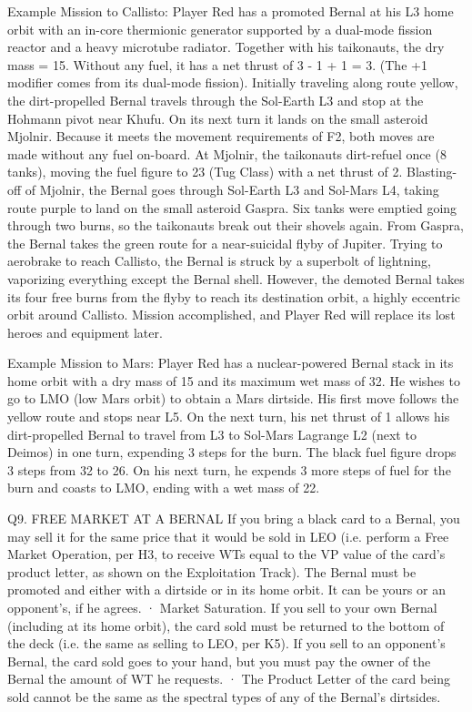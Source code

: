\documentclass[a4paper]{book}
\begin{document}
Example Mission to Callisto: Player Red has a promoted Bernal at his L3 home orbit with an in-core thermionic generator supported by a dual-mode fission reactor and a heavy microtube radiator. Together with his taikonauts, the dry mass = 15. Without any fuel, it has a net thrust of 3 - 1 + 1 = 3. (The +1 modifier comes from its dual-mode fission). Initially traveling along route yellow, the dirt-propelled Bernal travels through the Sol-Earth L3 and stop at the Hohmann pivot near Khufu. On its next turn it lands on the small asteroid Mjolnir. Because it meets the movement requirements of F2, both moves are made without any fuel on-board. At Mjolnir, the taikonauts dirt-refuel once (8 tanks), moving the fuel figure to 23 (Tug Class) with a net thrust of 2. Blasting-off of Mjolnir, the Bernal goes through Sol-Earth L3 and Sol-Mars L4, taking route purple to land on the small asteroid Gaspra. Six tanks were emptied going through two burns, so the taikonauts break out their shovels again. From Gaspra, the Bernal takes the green route for a near-suicidal flyby of Jupiter. Trying to aerobrake to reach Callisto, the Bernal is struck by a superbolt of lightning, vaporizing everything except the Bernal shell. However, the demoted Bernal takes its four free burns from the flyby to reach its destination orbit, a highly eccentric orbit around Callisto. Mission accomplished, and Player Red will replace its lost heroes and equipment later.

Example Mission to Mars: Player Red has a nuclear-powered Bernal stack in its home orbit with a dry mass of 15 and its maximum wet mass of 32. He wishes to go to LMO (low Mars orbit) to obtain a Mars dirtside. His first move follows the yellow route and stops near L5.  On the next turn, his net thrust of 1 allows his dirt-propelled Bernal to travel from L3 to Sol-Mars Lagrange L2 (next to Deimos) in one turn, expending 3 steps for the burn. The black fuel figure drops 3 steps from 32 to 26. On his next turn, he expends 3 more steps of fuel for the burn and coasts to LMO, ending with a wet mass of 22.

Q9. FREE MARKET AT A BERNAL
If you bring a black card to a Bernal, you may sell it for the same price that it would be sold in LEO (i.e. perform a Free Market Operation, per H3, to receive WTs equal to the VP value of the card’s product letter, as shown on the Exploitation Track). The Bernal must be promoted and either with a dirtside or in its home orbit. It can be yours or an opponent’s, if he agrees.
·       Market Saturation. If you sell to your own Bernal (including at its home orbit), the card sold must be returned to the bottom of the deck (i.e. the same as selling to LEO, per K5). If you sell to an opponent’s Bernal, the card sold goes to your hand, but you must pay the owner of the Bernal the amount of WT he requests.
·       The Product Letter of the card being sold cannot be the same as the spectral types of any of the Bernal’s dirtsides.
\end{document}
